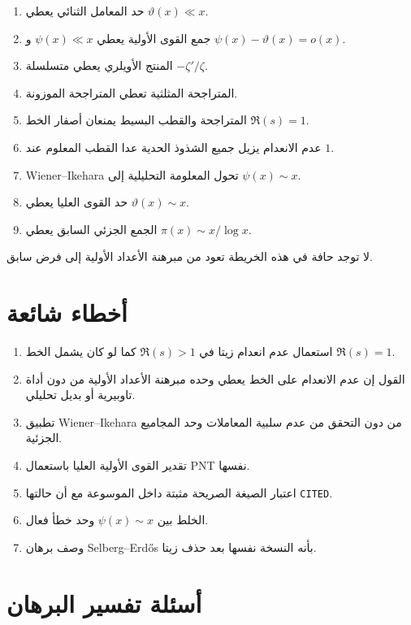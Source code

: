 \begin{enumerate}
  \item حد المعامل الثنائي يعطي \(\vartheta(x)\ll x\).
  \item جمع القوى الأولية يعطي \(\psi(x)\ll x\) و
  \(\psi(x)-\vartheta(x)=o(x)\).
  \item المنتج الأويلري يعطي متسلسلة \(-\zeta'/\zeta\).
  \item المتراجحة المثلثية تعطي المتراجحة الموزونة.
  \item المتراجحة والقطب البسيط يمنعان أصفار الخط \(\Re(s)=1\).
  \item عدم الانعدام يزيل جميع الشذوذ الحدية عدا القطب المعلوم عند \(1\).
  \item Wiener--Ikehara تحول المعلومة التحليلية إلى \(\psi(x)\sim x\).
  \item حد القوى العليا يعطي \(\vartheta(x)\sim x\).
  \item الجمع الجزئي السابق يعطي \(\pi(x)\sim x/\log x\).
\end{enumerate}

لا توجد حافة في هذه الخريطة تعود من مبرهنة الأعداد الأولية إلى فرض سابق.

\section{أخطاء شائعة}

\begin{enumerate}
  \item استعمال عدم انعدام زيتا في \(\Re(s)>1\) كما لو كان يشمل الخط
  \(\Re(s)=1\).
  \item القول إن عدم الانعدام على الخط يعطي وحده مبرهنة الأعداد الأولية من
  دون أداة تاوبيرية أو بديل تحليلي.
  \item تطبيق Wiener--Ikehara من دون التحقق من عدم سلبية المعاملات وحد
  المجاميع الجزئية.
  \item تقدير القوى الأولية العليا باستعمال PNT نفسها.
  \item اعتبار الصيغة الصريحة مثبتة داخل الموسوعة مع أن حالتها
  \textenglish{\texttt{CITED}}.
  \item الخلط بين \(\psi(x)\sim x\) وحد خطأ فعال.
  \item وصف برهان Selberg--Erdős بأنه النسخة نفسها بعد حذف زيتا.
\end{enumerate}

\section{أسئلة تفسير البرهان}

